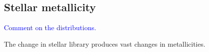 \documentclass[onecolumn]{aa}
\begin{document}
% 

\subsection{Stellar metallicity}
\textcolor{blue}{Comment on the distributions.}

The change in stellar library produces vast changes in metallicities.
\end{document}
